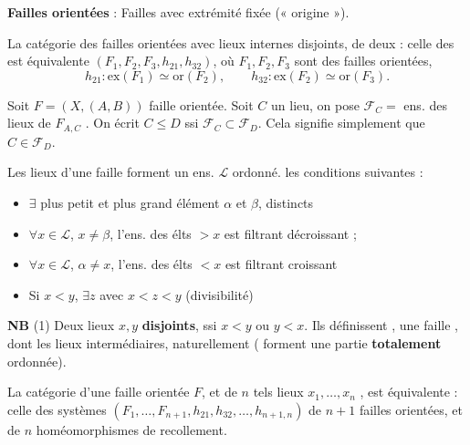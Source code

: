 \documentclass[11pt,a4paper]{article}
\begin{document}
\textbf{Failles orientées} : Failles avec extrémité fixée (« origine »).

\struck{\ill{}} La catégorie des failles orientées avec  lieux internes disjoints, de deux \ill{} : celle des  \ill{} est équivalente \ill{}  $(F_1, F_2, F_3, h_{21}, h_{32})$, où $F_1, F_2, F_3$ sont des failles orientées,
\[
  h_{21} : \mathrm{ex}(F_1) \simeq \mathrm{or}(F_2), \qquad h_{32} : \mathrm{ex}(F_2) \simeq \mathrm{or}(F_3).
\]

Soit $F = (X, (A,B))$ faille orientée. Soit $C$ un lieu, on pose $\mathcal{F}_C =$ ens. des lieux de $F_{A,C}$
.
On écrit $C \leq D$ ssi $\mathcal{F}_C \subset \mathcal{F}_D$. Cela signifie simplement que $C \in \mathcal{F}_D$.

Les lieux d'une faille  forment un ens. $\mathcal{L}$ ordonné.  les conditions suivantes :
\begin{itemize}
  \item[a)] $\exists$ plus petit et plus grand élément $\alpha$ et $\beta$, distincts
  \item[b)] $\forall x \in \mathcal{L}$, $x \neq \beta$, \struck{\ill{}} l'ens. des élts $> x$ est filtrant décroissant ;
  \item[b')] $\forall x \in \mathcal{L}$, $\alpha \neq x$, l'ens. des élts $< x$ est filtrant croissant
  \item[c)] Si $x < y$, $\exists z$ avec $x < z < y$ (divisibilité)
\end{itemize}

\textbf{NB} (1) Deux lieux $x, y$  \textbf{disjoints},  ssi $x < y$ ou $y < x$. Ils définissent ,  \ill{} une faille \ill{}, dont les lieux intermédiaires, naturellement \ill{} (\ill{} forment une partie \textbf{totalement} ordonnée).

La catégorie \ill{} d'une faille orientée $F$, et de $n$ tels lieux $x_1, \dots, x_n$ , est équivalente : celle des systèmes $(F_1, \dots, F_{n+1}, h_{21}, h_{32}, \dots, h_{n+1,n})$ de $n+1$ failles orientées, et de $n$ homéomorphismes de recollement.
\end{document}
